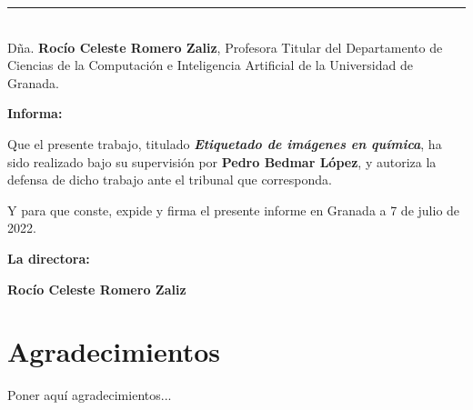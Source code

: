 \noindent\rule[-1ex]{\textwidth}{2pt}\\[4.5ex]

Dña. \textbf{Rocío Celeste Romero Zaliz}, Profesora Titular del Departamento de Ciencias de la Computación e Inteligencia Artificial de la Universidad de Granada.


\vspace{0.5cm}

\textbf{Informa:}

\vspace{0.5cm}

Que el presente trabajo, titulado \textit{\textbf{Etiquetado de imágenes en química}},
ha sido realizado bajo su supervisión por \textbf{Pedro Bedmar López}, y autoriza la defensa de dicho trabajo ante el tribunal que corresponda.

\vspace{0.5cm}

Y para que conste, expide y firma el presente informe en Granada a 7 de julio de 2022.

\vspace{1cm}

\textbf{La directora:}

\vspace{5cm}

\noindent \textbf{Rocío Celeste Romero Zaliz}

\chapter*{Agradecimientos}
\thispagestyle{empty}

       \vspace{1cm}


Poner aquí agradecimientos...


